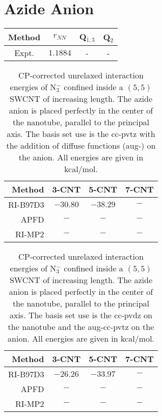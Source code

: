 \documentclass{article}
\begin{document}
\section{Azide Anion}

\begin{table}
    \centering
    \begin{tabular}{c|ccc}
        Method      & $r_{NN}$  & Q$_{1,3}$ & Q$_2$ \\
        \midrule

        Expt.\cite{Polak1987} & $1.1884$  & -         & -
    \end{tabular}
\end{table}



\begin{table}
    \centering
    \begin{tabular}{r ccc}
        \toprule
        Method   & 3-CNT     & 5-CNT     & 7-CNT \\
        \midrule
        RI-B97D3 & $-30.80$  & $-38.29$  & $-$   \\
        APFD     & $-$       & $-$     & $-$   \\
        RI-MP2   & $-$       & $-$     & $-$   \\
        \bottomrule
    \end{tabular}
    \caption{CP-corrected unrelaxed interaction energies of N$_3^-$ confined inside a $(5,5)$ SWCNT of increasing length. The azide anion is placed perfectly in the center of the nanotube, parallel to the principal axis. The basis set use is the cc-pvtz with the addition of diffuse functions (aug-) on the anion. All energies are given in kcal/mol.}
\label{tab:eint_cnt55x_cc-pvtz}
\end{table}

\begin{table}
    \centering
    \begin{tabular}{r ccc}
        \toprule
        Method   & 3-CNT     & 5-CNT     & 7-CNT \\
        \midrule
        RI-B97D3 & $-26.26$  & $-33.97$  & $-$   \\
        APFD     & $-$       & $-$     & $-$   \\
        RI-MP2   & $-$       & $-$     & $-$   \\
        \bottomrule
    \end{tabular}
    \caption{CP-corrected unrelaxed interaction energies of N$_3^-$ confined inside a $(5,5)$ SWCNT of increasing length. The azide anion is placed perfectly in the center of the nanotube, parallel to the principal axis. The basis set use is the cc-pvdz on the nanotube and the aug-cc-pvtz on the anion. All energies are given in kcal/mol.}
\label{tab:eint_cnt55x_cc-pvtz}
\end{table}
\end{document}
